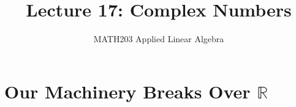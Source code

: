 \documentclass[10pt]{beamer}
\title{Lecture 17: Complex Numbers}
\subtitle{MATH203 Applied Linear Algebra}
\date{}
\theoremstyle{definition}
\begin{document}
\maketitle


\section{Our Machinery Breaks Over $\mathbb{R}$}
\end{document}
